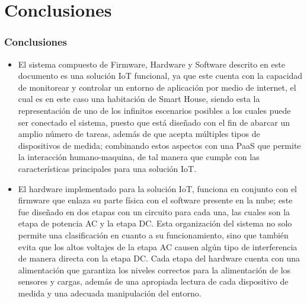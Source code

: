 \section{Conclusiones}

\begin{frame}
\frametitle{Conclusiones}
\begin{itemize}
	\item El sistema compuesto de Firmware, Hardware y Software descrito en este documento es una solución IoT funcional, ya que este cuenta con la capacidad de monitorear y controlar un entorno de aplicación por medio de internet, el cual es en este caso una habitación de Smart House, siendo esta la representación de uno de los infinitos escenarios posibles a los cuales puede ser conectado el sistema, puesto que está diseñado con el fin de abarcar un amplio número de tareas, además de que acepta múltiples tipos de dispositivos de medida; combinando estos aspectos con una PaaS que permite la interacción humano-maquina, de tal manera que cumple con las características principales para una solución IoT.\\
\end{itemize}
\end{frame}


\begin{frame}
\begin{itemize}
	\item El hardware implementado para la solución IoT, funciona en conjunto con el firmware que enlaza su parte física con el software presente en la nube; este fue diseñado en dos etapas con un circuito para cada una, las cuales son la etapa de potencia AC y la etapa DC. Esta organización del sistema no solo permite una clasificación en cuanto a su funcionamiento, sino que también evita que los altos voltajes de la etapa AC causen algún tipo de interferencia de manera directa con la etapa DC. Cada etapa del hardware cuenta con una alimentación que garantiza los niveles correctos para la alimentación de los sensores y cargas, además de una apropiada lectura de cada dispositivo de medida y una adecuada manipulación del entorno.\\
\end{itemize}
\end{frame}


